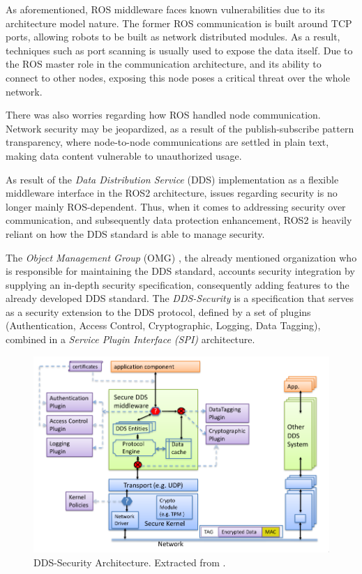 As aforementioned, ROS middleware faces known vulnerabilities due to its architecture model nature. The former ROS communication is built around TCP ports, allowing robots to be built as network distributed modules. As a result, techniques such as port scanning is usually used to expose the data itself. Due to the ROS master role in the communication architecture, and its ability to connect to other nodes, exposing this node poses a critical threat over the whole network. \cite{8794451} 

There was also worries regarding how ROS handled node communication. Network security may be jeopardized, as a result of the publish-subscribe pattern transparency, where node-to-node communications are settled in plain text, making data content vulnerable to unauthorized usage. \cite{kim2018security}

As result of the \textit{Data Distribution Service} (DDS) implementation as a flexible middleware interface in the ROS2 architecture, issues regarding security is no longer mainly ROS-dependent. Thus, when it comes to addressing security over communication, and subsequently data protection enhancement, ROS2 is heavily reliant on how the DDS standard is able to manage security. \cite{kim2018security, 8794451}

The \textit{Object Management Group} (OMG) \cite{3}, the already mentioned organization who is responsible for maintaining the DDS standard, accounts security integration by supplying an in-depth security specification, consequently adding features to the already developed DDS standard. The \textit{DDS-Security} is a specification that serves as a security extension to the DDS protocol, defined by a set of plugins (Authentication, Access Control, Cryptographic, Logging, Data Tagging), combined in a \textit{Service Plugin Interface (SPI)} architecture. \cite{8442103, ros-dds-integration}

\begin{figure}[H]
    \centering
    \includegraphics[width=0.7\linewidth]{images/dds-security-architecture.png}
    \caption{DDS-Security Architecture. Extracted from \cite{dds-s}.}
    \label{fig:dds-security-architecture}
\end{figure}


